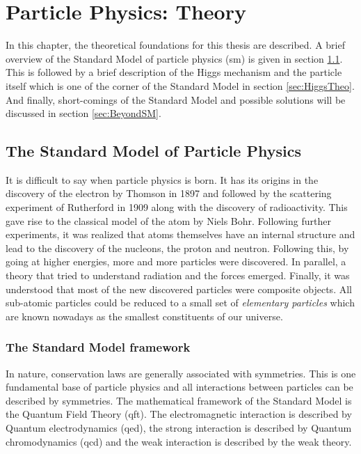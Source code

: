 \chapter{Particle Physics: Theory}
\label{chap:Theory}

In this chapter, the theoretical foundations for this thesis are described. A brief overview of the Standard Model of particle physics (\acrshort{sm}) is given in section \ref{sec:SM}. This is followed by a brief description of the Higgs mechanism and the particle itself which is one of the corner of the Standard Model in section \ref{sec:HiggsTheo}. And finally, short-comings of the Standard Model and possible solutions will be discussed in section \ref{sec:BeyondSM}.

\section{The Standard Model of Particle Physics}
\label{sec:SM}

It is difficult to say when particle physics is born. It has its origins in the discovery of the electron by Thomson \cite{JJThomson:1897} in 1897 and followed by the scattering experiment of Rutherford \cite{Rutherford:1911} in 1909 along with the discovery of radioactivity. This gave rise to the classical model of the atom by Niels Bohr. Following further experiments, it was realized that atoms themselves have an internal structure and lead to the discovery of the nucleons, the proton and neutron. Following this, by going at higher energies, more and more particles were discovered. In parallel, a theory that tried to understand radiation and the forces emerged. Finally, it was understood that most of the new discovered particles were composite objects. All sub-atomic particles could be reduced to a small set of \textit{elementary particles} which are known nowadays as the smallest constituents of our universe.

\subsection{The Standard Model framework}

In nature, conservation laws are generally associated with symmetries. This is one fundamental base of particle physics and all interactions between particles can be described by symmetries. The mathematical framework of the Standard Model is the Quantum Field Theory (\acrshort{qft}). The electromagnetic interaction is described by Quantum electrodynamics (\acrshort{qed}), the strong interaction is described by Quantum chromodynamics (\acrshort{qcd}) and the weak interaction is described by the weak theory.

